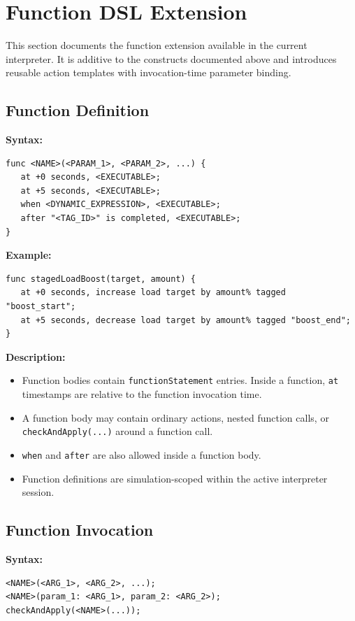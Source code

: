 \documentclass[12pt]{article}
\begin{document}
\section{Function DSL Extension}

This section documents the function extension available in the current interpreter. It is additive to the
constructs documented above and introduces reusable action templates with invocation-time parameter binding.

\subsection{Function Definition}

\textbf{Syntax:}
\begin{lstlisting}
func <NAME>(<PARAM_1>, <PARAM_2>, ...) {
   at +0 seconds, <EXECUTABLE>;
   at +5 seconds, <EXECUTABLE>;
   when <DYNAMIC_EXPRESSION>, <EXECUTABLE>;
   after "<TAG_ID>" is completed, <EXECUTABLE>;
}
\end{lstlisting}

\textbf{Example:}
\begin{lstlisting}
func stagedLoadBoost(target, amount) {
   at +0 seconds, increase load target by amount% tagged "boost_start";
   at +5 seconds, decrease load target by amount% tagged "boost_end";
}
\end{lstlisting}

\textbf{Description:}
\begin{itemize}
  \item Function bodies contain \texttt{functionStatement} entries. Inside a function, \texttt{at} timestamps are
        relative to the function invocation time.
  \item A function body may contain ordinary actions, nested function calls, or \texttt{checkAndApply(...)} around
        a function call.
  \item \texttt{when} and \texttt{after} are also allowed inside a function body.
  \item Function definitions are simulation-scoped within the active interpreter session.
\end{itemize}

\subsection{Function Invocation}

\textbf{Syntax:}
\begin{lstlisting}
<NAME>(<ARG_1>, <ARG_2>, ...);
<NAME>(param_1: <ARG_1>, param_2: <ARG_2>);
checkAndApply(<NAME>(...));
\end{lstlisting}
\end{document}
